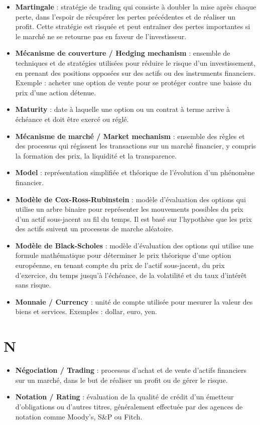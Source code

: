 \documentclass[a4paper,10pt]{article}
\begin{document}
\begin{multicols}{2}
\begin{itemize}
  \item \textbf{Martingale} : stratégie de trading qui consiste à doubler la mise après chaque perte, dans l’espoir de récupérer les pertes précédentes et de réaliser un profit. Cette stratégie est risquée et peut entraîner des pertes importantes si le marché ne se retourne pas en faveur de l’investisseur.
  \item \textbf{Mécanisme de couverture / Hedging mechanism} : ensemble de techniques et de stratégies utilisées pour réduire le risque d’un investissement, en prenant des positions opposées sur des actifs ou des instruments financiers. Exemple : acheter une option de vente pour se protéger contre une baisse du prix d’une action détenue.
  \item \textbf{Maturity} : date à laquelle une option ou un contrat à terme arrive à échéance et doit être exercé ou réglé.
  \item \textbf{Mécanisme de marché / Market mechanism} : ensemble des règles et des processus qui régissent les transactions sur un marché financier, y compris la formation des prix, la liquidité et la transparence.
  \item \textbf{Model} : représentation simplifiée et théorique de l’évolution d’un phénomène financier.
  \item \textbf{Modèle de Cox-Ross-Rubinstein} : modèle d’évaluation des options qui utilise un arbre binaire pour représenter les mouvements possibles du prix d’un actif sous-jacent au fil du temps. Il est basé sur l’hypothèse que les prix des actifs suivent un processus de marche aléatoire.
  \item \textbf{Modèle de Black-Scholes} : modèle d’évaluation des options qui utilise une formule mathématique pour déterminer le prix théorique d’une option européenne, en tenant compte du prix de l’actif sous-jacent, du prix d’exercice, du temps jusqu’à l’échéance, de la volatilité et du taux d’intérêt sans risque.
  \item \textbf{Monnaie / Currency} : unité de compte utilisée pour mesurer la valeur des biens et services. Exemples : dollar, euro, yen.
\end{itemize}

\section*{N}
\begin{itemize}
  \item \textbf{Négociation / Trading} : processus d’achat et de vente d’actifs financiers sur un marché, dans le but de réaliser un profit ou de gérer le risque.
  \item \textbf{Notation / Rating} : évaluation de la qualité de crédit d’un émetteur d’obligations ou d’autres titres, généralement effectuée par des agences de notation comme Moody’s, S\&P ou Fitch.
\end{itemize}


\end{multicols}
\end{document}
